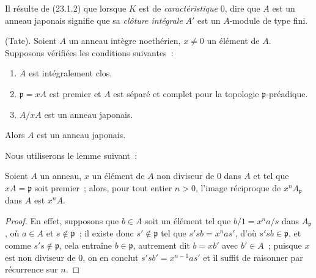 Il résulte de (23.1.2) que lorsque $K$ est de \emph{caractéristique} $0$, dire que
$A$ est un anneau japonais signifie que sa \emph{clôture intégrale} $A'$ est
un $A$-module de type fini.

\begin{theorem}[23.1.3]
\label{0.23.1.3-fr}
\textnormal{(Tate).} Soient $A$ un anneau intègre noethérien, $x\neq0$ un
élément de $A$. Supposons vérifiées les conditions suivantes~:
\begin{enumerate}
  \item[\textup{(i)}] $A$ est intégralement clos.
  \item[\textup{(ii)}] $\mathfrak p=xA$ est premier et $A$ est séparé et complet pour
  la topologie $\mathfrak p$-préadique.
  \item[\textup{(iii)}] $A/xA$ est un anneau japonais.
\end{enumerate}

Alors $A$ est un anneau japonais.
\end{theorem}

Nous utiliserons le lemme suivant~:

\begin{lemma}[23.1.3.1]
\label{0.23.1.3.1-fr}
Soient $A$ un anneau, $x$ un élément de $A$ non diviseur de $0$ dans $A$ et
tel que $xA=\mathfrak p$ soit premier~; alors, pour tout entier $n>0$,
l'image réciproque de $x^nA_{\mathfrak p}$ dans $A$ est $x^nA$.
\end{lemma}

\begin{proof}
En effet, supposons que $b\in A$ soit un élément tel que
$b/1=x^na/s$ dans $A_{\mathfrak p}$, où $a\in A$ et
$s\notin\mathfrak p$~; il existe donc $s'\notin\mathfrak p$ tel que
$s'sb=x^nas'$, d'où $s'sb\in\mathfrak p$, et comme
$s's\notin\mathfrak p$, cela entraîne $b\in\mathfrak p$, autrement dit
$b=xb'$ avec $b'\in A$~; puisque $x$ est non diviseur de $0$, on en conclut
$s'sb'=x^{n-1}as'$ et il suffit de raisonner par récurrence sur $n$.
\end{proof}

